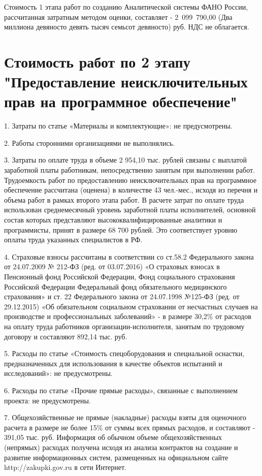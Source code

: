 Стоимость 1 этапа работ по созданию Аналитической системы ФАНО России, рассчитанная затратным методом оценки, составляет - 2~099~790,00 (Два миллиона девяносто девять тысяч семьсот девяносто) руб. НДС не облагается.


\section*{Стоимость работ по 2 этапу "Предоставление неисключительных прав на программное обеспечение"}


1.	Затраты по статье «Материалы и комплектующие»:	не предусмотрены.

2. Работы сторонними организациями не выполнялись.

3. Затраты по оплате труда в объеме 2 954,10 тыс. рублей связаны с выплатой заработной платы работникам, непосредственно занятым при выполнении работ. Трудоемкость работ по предоставлению неисключительных прав на программное обеспечение рассчитана (оценена) в количестве 43 чел.-мес., исходя из перечня и объема работ в рамках второго этапа работ. В расчете затрат по оплате труда использован среднемесячный уровень заработной платы исполнителей, основной состав которых представляют высококвалифицированные аналитики и программисты, принят в размере 68 700 рублей. Это соответствует уровню оплаты труда указанных специалистов в РФ.

4. Страховые взносы рассчитаны в соответствии со ст.58.2 Федерального закона от 24.07.2009 № 212-ФЗ (ред. от 03.07.2016) «О страховых взносах в Пенсионный фонд Российской Федерации, Фонд социального страхования Российской Федерации Федеральный фонд обязательного медицинского страхования» и ст. 22 Федерального закона от 24.07.1998 №125-ФЗ (ред. от 29.12.2015)	«Об обязательном социальном страховании от несчастных случаев на производстве и профессиональных заболеваний» - в размере 30,2\% от расходов на оплату труда работников организации-исполнителя, занятым по трудовому договору и составляют 892,14 тыс. руб.

5.	Расходы по статье «Стоимость спецоборудования и специальной оснастки, предназначенных для использования в качестве объектов испытаний и исследований»: не предусмотрены.

6.	Расходы по статье «Прочие прямые расходы», связанные с выполнением проекта: не предусмотрены.

7.	Общехозяйственные не прямые (накладные) расходы взяты для оценочного расчета в размере не более 15\% от суммы всех прямых расходов, и составляют - 391,05 тыс. руб. Информация об обычном объеме общехозяйственных (непрямых) расходах получена исходя из анализа контрактов на создание и развитие информационных систем, размещенных на официальном сайте http://zakupki.gov.ru в сети Интернет.

